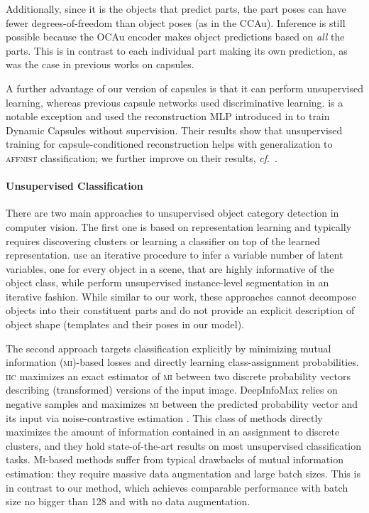 Additionally, since it is the objects that predict parts, the part poses can have fewer degrees-of-freedom than object poses (as in the \gls{CCAu}). 
Inference is still possible because the \gls{OCAu} encoder makes object predictions based on {\it all} the parts.
This is in contrast to each individual part making its own prediction, as was the case in previous works on capsules.

A further advantage of our version of capsules is that it can perform unsupervised learning, whereas previous capsule networks used discriminative learning. 
\cite{Rawlinson2018sparsecaps} is a notable exception and used the reconstruction \gls{MLP} introduced in \cite{Sabour2017capsule} to train Dynamic Capsules without supervision.
Their results show that unsupervised training for capsule-conditioned reconstruction helps with generalization to \textsc{affnist} classification; we further improve on their results, \textit{cf}.\ .

\paragraph{Unsupervised Classification}
There are two main approaches to unsupervised object category detection in computer vision.
The first one is based on representation learning and typically requires discovering clusters or learning a classifier on top of the learned representation.
\cite{Eslami2016air,Kosiorek2018sqair} use an iterative procedure to infer a variable number of latent variables, one for every object in a scene, that are highly informative of the object class, while \cite{Greff2019multi,Burgess2019monet} perform unsupervised instance-level segmentation in an iterative fashion.
While similar to our work, these approaches cannot decompose objects into their constituent parts and do not provide an explicit description of object shape (\!\eg templates and their poses in our model).

The second approach targets classification explicitly by minimizing mutual information (\textsc{mi})-based losses and directly learning class-assignment probabilities.
\textsc{iic} \citep{Ji2018iic} maximizes an exact estimator of \textsc{mi} between two discrete probability vectors describing (transformed) versions of the input image.
DeepInfoMax \citep{Hjelm2019deepinfomax} relies on negative samples and maximizes \textsc{mi} between the predicted probability vector and its input via noise-contrastive estimation \citep{Gutmann2010nce}.
This class of methods directly maximizes the amount of information contained in an assignment to discrete clusters, and they hold state-of-the-art results on most unsupervised classification tasks.
\textsc{Mi}-based methods suffer from typical drawbacks of mutual information estimation: they require massive data augmentation and large batch sizes.
This is in contrast to our method, which achieves comparable performance with batch size no bigger than 128 and with no data augmentation.

